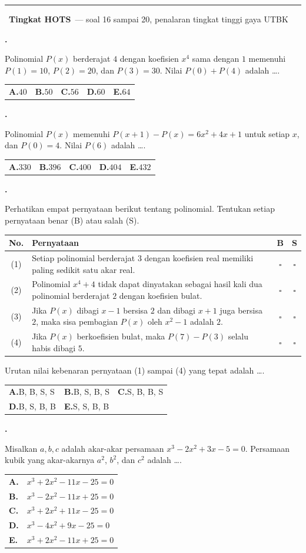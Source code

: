 \documentclass[a4paper,11pt]{article}
\makeatletter
\newcounter{no}
\newcommand{\tingkat}[2]{\par\Needspace{7\baselineskip}\vspace{0.6em}\noindent
  {\color{pinkx}\rule{3pt}{1.1em}}\ {\color{redx}\bfseries #1}\ {\small\color{gray}--- #2}\par\vspace{0.1em}}
\newcommand{\soal}[2]{\par\vspace{0.75em}\stepcounter{no}\noindent
  \begin{minipage}[t]{1.8em}\textbf{\theno.}\end{minipage}%
  \begin{minipage}[t]{\dimexpr\linewidth-1.8em\relax}#1\par\vspace{0.35em}#2\end{minipage}\par}
\newcommand{\pil}[5]{\begin{tabularx}{\linewidth}{@{}*{5}{X}@{}}\textbf{A.}\;#1 & \textbf{B.}\;#2 & \textbf{C.}\;#3 & \textbf{D.}\;#4 & \textbf{E.}\;#5\end{tabularx}}
\makeatother
\begin{document}
\tingkat{Tingkat HOTS}{soal 16 sampai 20, penalaran tingkat tinggi gaya UTBK}
\soal{Polinomial $P(x)$ berderajat $4$ dengan koefisien $x^4$ sama dengan $1$ memenuhi $P(1)=10$, $P(2)=20$, dan $P(3)=30$. Nilai $P(0)+P(4)$ adalah \dots.}{\pil{$40$}{$50$}{$56$}{$60$}{$64$}}
\soal{Polinomial $P(x)$ memenuhi $P(x+1)-P(x)=6x^2+4x+1$ untuk setiap $x$, dan $P(0)=4$. Nilai $P(6)$ adalah \dots.}{\pil{$330$}{$396$}{$400$}{$404$}{$432$}}
\soal{Perhatikan empat pernyataan berikut tentang polinomial. Tentukan setiap pernyataan benar (B) atau salah (S).\par\smallskip
\begin{tabularx}{\linewidth}{@{}c X c c@{}}
\hline
\textbf{No.} & \textbf{Pernyataan} & \textbf{B} & \textbf{S}\\ \hline
(1) & Setiap polinomial berderajat $3$ dengan koefisien real memiliki paling sedikit satu akar real. & $\square$ & $\square$\\
(2) & Polinomial $x^4+4$ tidak dapat dinyatakan sebagai hasil kali dua polinomial berderajat $2$ dengan koefisien bulat. & $\square$ & $\square$\\
(3) & Jika $P(x)$ dibagi $x-1$ bersisa $2$ dan dibagi $x+1$ juga bersisa $2$, maka sisa pembagian $P(x)$ oleh $x^2-1$ adalah $2$. & $\square$ & $\square$\\
(4) & Jika $P(x)$ berkoefisien bulat, maka $P(7)-P(3)$ selalu habis dibagi $5$. & $\square$ & $\square$\\ \hline
\end{tabularx}\par\smallskip
Urutan nilai kebenaran pernyataan (1) sampai (4) yang tepat adalah \dots.}{\begin{tabularx}{\linewidth}{@{}*{3}{X}@{}}\textbf{A.}\;B, B, S, S & \textbf{B.}\;B, S, B, S & \textbf{C.}\;S, B, B, S\\[3pt] \textbf{D.}\;B, S, B, B & \textbf{E.}\;S, S, B, B & \end{tabularx}}
\soal{Misalkan $a,b,c$ adalah akar-akar persamaan $x^3-2x^2+3x-5=0$. Persamaan kubik yang akar-akarnya $a^2$, $b^2$, dan $c^2$ adalah \dots.}{\begin{tabularx}{\linewidth}{@{}lX@{}}
\textbf{A.} & $x^3+2x^2-11x-25=0$\\
\textbf{B.} & $x^3-2x^2-11x+25=0$\\
\textbf{C.} & $x^3+2x^2+11x-25=0$\\
\textbf{D.} & $x^3-4x^2+9x-25=0$\\
\textbf{E.} & $x^3+2x^2-11x+25=0$
\end{tabularx}}
\end{document}
